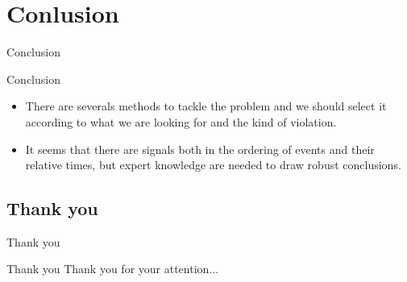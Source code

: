 \documentclass{beamer}
\begin{document}

\section{Conlusion}
\begin{frame}{Conclusion}
    \begin{block}{Conclusion}
    \begin{itemize}
        \item There are severals methods to tackle the problem and we should select it according to what we are looking for and the kind of violation.
        \item It seems that there are signals both in the ordering of events and their relative times, but expert knowledge are needed to draw robust conclusions.
    \end{itemize}
    \end{block}
\end{frame}




\subsection*{Thank you}
\begin{frame}{Thank you}
    \begin{block}{Thank you}
    Thank you for your attention...
    \end{block}
\end{frame}

\appendix
\end{document}

